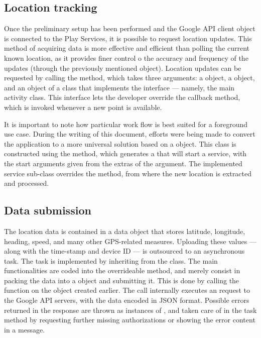 \subsection{Location tracking}
Once the preliminary setup has been performed and the Google API client object is connected to the Play Services, it is possible to request location updates.
This method of acquiring data is more effective and efficient than polling the current known location, as it provides finer control o the accuracy and frequency of the updates (through the previously mentioned  object).
Location updates can be requested by calling the  method, which takes three arguments: a  object, a  object, and an object of a class that implements the  interface --- namely, the main activity class.
This interface lets the developer override the  callback method, which is invoked whenever a new point is available.

It is important to note how  particular work flow is best suited for a foreground use case.
During the writing of this document, efforts were being made to convert the application to a more universal solution based on a  object.
This class is constructed using the  method, which generates a  that will start a service, with the start arguments given from the extras of the  argument.
The implemented service sub-class overrides the  method, from where the new location is extracted and processed.


\subsection{Data submission}
The location data is contained in a  data object that stores latitude, longitude, heading, speed, and many other GPS-related measures.
Uploading these values --- along with the time-stamp and device ID --- is outsourced to an asynchronous task.
The task is implemented by inheriting from the  class.
The main functionalities are coded into the overrideable  method, and merely consist in packing the data into a  object and submitting it.
This is done by calling the  function on the  object created earlier.
The call internally executes an  request to the Google API servers, with the data encoded in JSON format.
Possible errors returned in the response are thrown as instances of , and taken care of in the task  method by requesting further missing authorizations or showing the error content in a message.


